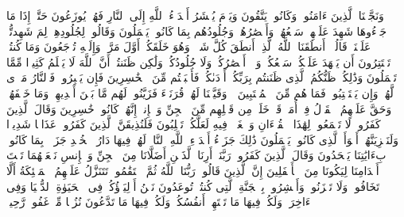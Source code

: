 \stopbuffer%
\startbuffer[\q:41:18]
وَنَجَّیۡنَا ٱلَّذِینَ ءَامَنُوا۟ وَكَانُوا۟ یَتَّقُونَ%
\stopbuffer%
\startbuffer[\q:41:19]
وَیَوۡمَ یُحۡشَرُ أَعۡدَاۤءُ ٱللَّهِ إِلَى ٱلنَّارِ فَهُمۡ یُوزَعُونَ%
\stopbuffer%
\startbuffer[\q:41:20]
حَتَّىٰۤ إِذَا مَا جَاۤءُوهَا شَهِدَ عَلَیۡهِمۡ سَمۡعُهُمۡ وَأَبۡصَٰرُهُمۡ وَجُلُودُهُم بِمَا كَانُوا۟ یَعۡمَلُونَ%
\stopbuffer%
\startbuffer[\q:41:21]
وَقَالُوا۟ لِجُلُودِهِمۡ لِمَ شَهِدتُّمۡ عَلَیۡنَاۖ قَالُوۤا۟ أَنطَقَنَا ٱللَّهُ ٱلَّذِیۤ أَنطَقَ كُلَّ شَیۡءࣲۚ وَهُوَ خَلَقَكُمۡ أَوَّلَ مَرَّةࣲ وَإِلَیۡهِ تُرۡجَعُونَ%
\stopbuffer%
\startbuffer[\q:41:22]
وَمَا كُنتُمۡ تَسۡتَتِرُونَ أَن یَشۡهَدَ عَلَیۡكُمۡ سَمۡعُكُمۡ وَلَاۤ أَبۡصَٰرُكُمۡ وَلَا جُلُودُكُمۡ وَلَٰكِن ظَنَنتُمۡ أَنَّ ٱللَّهَ لَا یَعۡلَمُ كَثِیرࣰا مِّمَّا تَعۡمَلُونَ%
\stopbuffer%
\startbuffer[\q:41:23]
وَذَٰلِكُمۡ ظَنُّكُمُ ٱلَّذِی ظَنَنتُم بِرَبِّكُمۡ أَرۡدَىٰكُمۡ فَأَصۡبَحۡتُم مِّنَ ٱلۡخَٰسِرِینَ%
\stopbuffer%
\startbuffer[\q:41:24]
فَإِن یَصۡبِرُوا۟ فَٱلنَّارُ مَثۡوࣰى لَّهُمۡۖ وَإِن یَسۡتَعۡتِبُوا۟ فَمَا هُم مِّنَ ٱلۡمُعۡتَبِینَ%
\stopbuffer%
\startbuffer[\q:41:25]
۞ وَقَیَّضۡنَا لَهُمۡ قُرَنَاۤءَ فَزَیَّنُوا۟ لَهُم مَّا بَیۡنَ أَیۡدِیهِمۡ وَمَا خَلۡفَهُمۡ وَحَقَّ عَلَیۡهِمُ ٱلۡقَوۡلُ فِیۤ أُمَمࣲ قَدۡ خَلَتۡ مِن قَبۡلِهِم مِّنَ ٱلۡجِنِّ وَٱلۡإِنسِۖ إِنَّهُمۡ كَانُوا۟ خَٰسِرِینَ%
\stopbuffer%
\startbuffer[\q:41:26]
وَقَالَ ٱلَّذِینَ كَفَرُوا۟ لَا تَسۡمَعُوا۟ لِهَٰذَا ٱلۡقُرۡءَانِ وَٱلۡغَوۡا۟ فِیهِ لَعَلَّكُمۡ تَغۡلِبُونَ%
\stopbuffer%
\startbuffer[\q:41:27]
فَلَنُذِیقَنَّ ٱلَّذِینَ كَفَرُوا۟ عَذَابࣰا شَدِیدࣰا وَلَنَجۡزِیَنَّهُمۡ أَسۡوَأَ ٱلَّذِی كَانُوا۟ یَعۡمَلُونَ%
\stopbuffer%
\startbuffer[\q:41:28]
ذَٰلِكَ جَزَاۤءُ أَعۡدَاۤءِ ٱللَّهِ ٱلنَّارُۖ لَهُمۡ فِیهَا دَارُ ٱلۡخُلۡدِ جَزَاۤءَۢ بِمَا كَانُوا۟ بِءَایَٰتِنَا یَجۡحَدُونَ%
\stopbuffer%
\startbuffer[\q:41:29]
وَقَالَ ٱلَّذِینَ كَفَرُوا۟ رَبَّنَاۤ أَرِنَا ٱلَّذَیۡنِ أَضَلَّانَا مِنَ ٱلۡجِنِّ وَٱلۡإِنسِ نَجۡعَلۡهُمَا تَحۡتَ أَقۡدَامِنَا لِیَكُونَا مِنَ ٱلۡأَسۡفَلِینَ%
\stopbuffer%
\startbuffer[\q:41:30]
إِنَّ ٱلَّذِینَ قَالُوا۟ رَبُّنَا ٱللَّهُ ثُمَّ ٱسۡتَقَٰمُوا۟ تَتَنَزَّلُ عَلَیۡهِمُ ٱلۡمَلَٰۤئِكَةُ أَلَّا تَخَافُوا۟ وَلَا تَحۡزَنُوا۟ وَأَبۡشِرُوا۟ بِٱلۡجَنَّةِ ٱلَّتِی كُنتُمۡ تُوعَدُونَ%
\stopbuffer%
\startbuffer[\q:41:31]
نَحۡنُ أَوۡلِیَاۤؤُكُمۡ فِی ٱلۡحَیَوٰةِ ٱلدُّنۡیَا وَفِی ٱلۡءَاخِرَةِۖ وَلَكُمۡ فِیهَا مَا تَشۡتَهِیۤ أَنفُسُكُمۡ وَلَكُمۡ فِیهَا مَا تَدَّعُونَ%
\stopbuffer%
\startbuffer[\q:41:32]
نُزُلࣰا مِّنۡ غَفُورࣲ رَّحِیمࣲ%
\stopbuffer%
